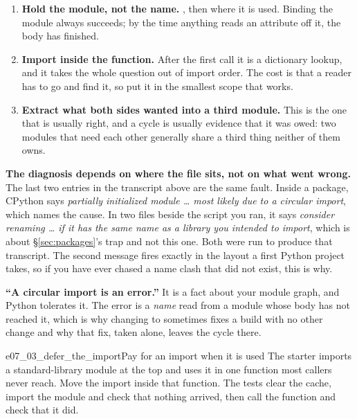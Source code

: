 \begin{enumerate}[leftmargin=1.6em, itemsep=3pt]
  \item \textbf{Hold the module, not the name.} , then
         where it is used. Binding the module always succeeds;
        by the time anything reads an attribute off it, the body has
        finished.
  \item \textbf{Import inside the function.} After the first call it is a
        dictionary lookup, and it takes the whole question out of import
        order. The cost is that a reader has to go and find it, so put it in
        the smallest scope that works.
  \item \textbf{Extract what both sides wanted into a third module.} This is
        the one that is usually right, and a cycle is usually evidence that
        it was owed: two modules that need each other generally share a
        third thing neither of them owns.
\end{enumerate}

\begin{warning}
\textbf{The diagnosis depends on where the file sits, not on what went
wrong.} The last two entries in the transcript above are the same fault.
Inside a package, CPython says \emph{partially initialized module
\dots{} most likely due to a circular import}, which names the cause. In
two files beside the script you ran, it says \emph{consider renaming
\dots{} if it has the same name as a library you intended to import},
which is about \S\ref{sec:packages}'s trap and not this one. Both were run
to produce that transcript. The second message fires exactly in the layout a
first Python project takes, so if you have ever chased a name clash that did
not exist, this is why.
\end{warning}

\begin{trapbox}
\textbf{\enquote{A circular import is an error.}} It is a fact about your
module graph, and Python tolerates it. The error is a \emph{name} read from
a module whose body has not reached it, which is why changing
 to  sometimes fixes a build with no
other change \dash{} and why that fix, taken alone, leaves the cycle there.
\end{trapbox}

\begin{exercise}{e07_03_defer_the_import}{Pay for an import when it is used}
The starter imports a standard-library module at the top and uses it in one
function most callers never reach. Move the import inside that function. The
tests clear the cache, import the module and check that nothing arrived,
then call the function and check that it did.
\end{exercise}

